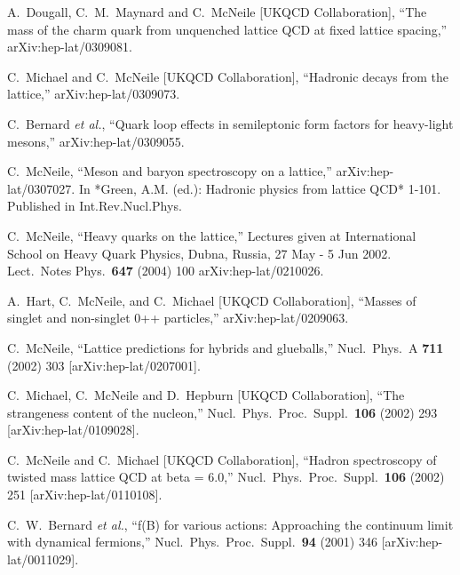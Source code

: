 \begin{thebibliography}{130}
A.~Dougall, C.~M.~Maynard and C.~McNeile  [UKQCD Collaboration],
``The mass of the charm quark from unquenched lattice QCD at fixed
lattice spacing,''
arXiv:hep-lat/0309081.



C.~Michael and C.~McNeile  [UKQCD Collaboration],
``Hadronic decays from the lattice,''
arXiv:hep-lat/0309073.


C.~Bernard {\it et al.},
``Quark loop effects in semileptonic form factors for heavy-light
mesons,''
arXiv:hep-lat/0309055.



C.~McNeile,
``Meson and baryon spectroscopy on a lattice,''
arXiv:hep-lat/0307027.
 In *Green, A.M. (ed.): Hadronic physics from lattice QCD* 1-101.
Published in Int.Rev.Nucl.Phys. 



C.~McNeile,
``Heavy quarks on the lattice,''
Lectures given at International School on Heavy Quark Physics, Dubna,
Russia, 27 May - 5
Jun 2002.
Lect.\ Notes Phys.\  {\bf 647} (2004) 100
arXiv:hep-lat/0210026.
%

A.~Hart, C.~McNeile, and C.~Michael  [UKQCD Collaboration],
``Masses of singlet and non-singlet 0++ particles,''
arXiv:hep-lat/0209063.

C.~McNeile,
``Lattice predictions for hybrids and glueballs,''
Nucl.\ Phys.\ A {\bf 711} (2002) 303
[arXiv:hep-lat/0207001].


C.~Michael, C.~McNeile and D.~Hepburn  [UKQCD Collaboration],
``The strangeness content of the nucleon,''
Nucl.\ Phys.\ Proc.\ Suppl.\  {\bf 106} (2002) 293
[arXiv:hep-lat/0109028].


C.~McNeile and C.~Michael  [UKQCD Collaboration],
``Hadron spectroscopy of twisted mass lattice QCD at beta = 6.0,''
Nucl.\ Phys.\ Proc.\ Suppl.\  {\bf 106} (2002) 251
[arXiv:hep-lat/0110108].


C.~W.~Bernard {\it et al.},
``f(B) for various actions: Approaching the continuum limit with  dynamical fermions,''
Nucl.\ Phys.\ Proc.\ Suppl.\  {\bf 94} (2001) 346
[arXiv:hep-lat/0011029].



\end{thebibliography}
